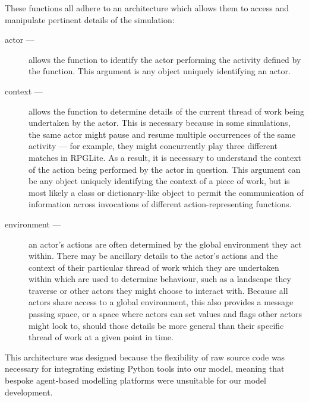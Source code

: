 These functions all adhere to an
architecture which allows them to access and manipulate pertinent details of the
simulation:

\begin{description}
  \item[actor ---] allows the function to identify the actor performing the activity
    defined by the function. This argument is any object uniquely identifying an
    actor.
  \item[context ---] allows the function to determine details of the current
    thread of work being undertaken by the actor. This is necessary because in
    some simulations, the same actor might pause and resume multiple
    occurrences of the same activity --- for example, they might concurrently
    play three different matches in RPGLite. As a result, it is necessary to
    understand the context of the action being performed by the actor in
    question. This argument can be any object uniquely identifying the context
    of a piece of work, but is most likely a class or dictionary-like object
    to permit the communication of information across invocations of different
    action-representing functions.
  \item[environment ---] an actor's actions are often determined by the global
    environment they act within. There may be ancillary details to the
    actor's actions and the context of their particular thread of work which
    they are undertaken within which are used to determine behaviour, such
    as a landscape they traverse or other actors they might choose to
    interact with. Because all actors share access to a global environment,
    this also provides a message passing space, or a space where actors can
    set values and flags other actors might look to, should those details be
    more general than their specific thread of work at a given point in time.
\end{description}

This architecture was designed because the flexibility of raw source code was
necessary for integrating existing Python tools into our model, meaning that
bespoke agent-based modelling platforms were unsuitable for our model
development.
\par

